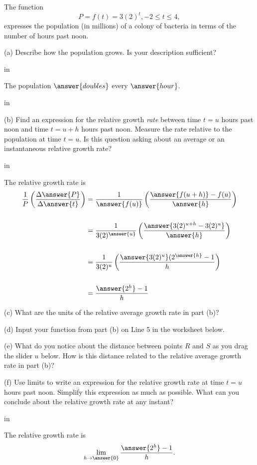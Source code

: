 \documentclass{ximera}
\newcommand{\pskip}{\vskip 0.1 in}
\begin{document}
\begin{question}  \label{Qdrg5h888}
The function 
\[
        P = f(t) = 3(2)^t , -2\leq t \leq 4 ,
\] 
expresses the population (in millions) of a colony of bacteria in terms of the number of hours past noon.

(a) Describe how the population grows. Is your description sufficient?

\pskip

The population $\answer{doubles}$ every $\answer{hour}$.

\pskip

(b) Find an expression for the relative growth \emph{rate} between time $t=u$ hours past noon and time $t=u+h$ hours past noon. Measure the rate relative to the population at time $t=u$. Is this question asking about an average or an instantaneous relative growth rate?

\pskip

The relative growth rate is
\begin{align*}
    \frac{1}{P} \left(  \frac{\Delta \answer{P}}{\Delta \answer{t}} \right)   &= \frac{1}{\answer{f(u)}} \left( \frac{\answer{f(u+h)} - f(u)}{\answer{h}}     \right)   \\ \\
                &= \frac{1}{3(2)^{\answer{u}}}   \left(   \frac{\answer{3(2)^{u+h}-3(2)^u}}{\answer{h}}     \right)  \\ \\
                &= \frac{1}{3(2)^u}   \left(   \frac{\answer{3(2)^u}(2^{\answer{h}}  -1}{h}  \right)  \\ \\
                &= \frac{\answer{2^h} - 1}{h}
\end{align*}

(c) What are the units of the relative average growth rate in part (b)?

(d) Input your function from part (b) on Line 5 in the worksheet below. 

(e) What do you notice about the distance between points $R$ and $S$ as you drag the slider $u$ below. How is this distance related to the relative average growth rate in part (b)?

(f) Use limits to write an expression for the relative growth rate at time $t=u$ hours past noon. Simplify this expression as much as possible.  What can you conclude about the relative growth rate at any instant?

\pskip

The relative growth rate is 
\[
    \lim_{h \to \answer{0}} \frac{\answer{2^h} - 1}{h} .
\]



\end{question}
\end{document}
